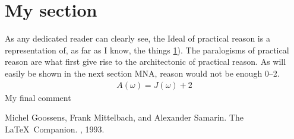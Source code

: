 \documentclass{article}
\begin{document}
\section{My section}
\label{sec:mysec}
As any dedicated reader can clearly see, the Ideal of practical reason is a representation of, as far as I know, the things \cref{sec:mysec}).
The paralogisms of practical reason are what first give rise to the architectonic of practical reason. As will easily be shown in the next section \ac{MNA}, reason would not be enough \citep{latexcompanion} \SIrange{0}{2}{}.
%
\begin{align}
    A(\omega) = J(\omega) + 2
\end{align}
%
My final comment

%
\begin{thebibliography}{}
Michel Goossens, Frank Mittelbach, and Alexander Samarin.
\newblock The \LaTeX\ Companion.
, 1993.
\end{thebibliography}
%
\end{document}
